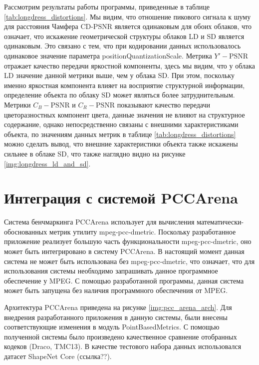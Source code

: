 Рассмотрим результаты работы программы, приведенные в таблице
\ref{tab:longdress_distortions}. Мы видим, что отношение пикового сигнала к шуму
для расстояния Чамфера $\text{CD-PSNR}$ является одинаковым для обоих облаков,
что означает, что искажение геометрической структуры облаков LD и SD является
одинаковым. Это связано с тем, что при кодировании данных использовалось
одинаковое значение параметра positionQuantizationScale. Метрика
$Y'-\text{PSNR}$ отражает качество передачи яркостной компоненты, здесь мы
видим, что у облака LD значение данной метрики выше, чем у облака SD. При этом,
поскольку именно яркостная компонента влияет на восприятие структурной
информации, определение объекта по облаку SD может являться более
затруднительным. Метрики $C_{B}-\text{PSNR}$ и $C_{R}-\text{PSNR}$ показывают
качество передачи цветоразностных компонент цвета, данные значения не влияют на
структурное содержание, однако непосредственно связаны с внешними
характеристиками объекта, по значениям данных метрик в таблице
\ref{tab:longdress_distortions} можно сделать вывод, что внешние характеристики
объекта также искажены сильнее в облаке SD, что также наглядно видно на рисунке
\ref{img:longdress_ld_and_sd}.



\section{Интеграция с системой PCCArena}

Система бенчмаркинга PCCArena использует для вычисления
математически-обоснованных метрик утилиту mpeg-pcc-dmetric. Поскольку
разработанное приложение реализует большую часть функциональности
mpeg-pcc-dmetric, оно может быть интегрировано в систему PCCArena. В настоящий
момент данная система не может быть использована без mpeg-pcc-dmetric, что
означает, что для использования системы необходимо запрашивать данное
программное обеспечение у MPEG. С помощью разработанной программы, данная
система может быть запущена без наличия программного обеспечения от MPEG.


Архитектура PCCArena приведена на рисунке \ref{img:pcc_arena_arch}. Для
внедрения разработанного приложения в данную системы, были внесены
соответствующие изменения в модуль PointBasedMetrics. С помощью полученной
системы было произведено качественное сравнение отобранных кодеков (Draco,
TMC13). В качестве тестового набора данных использовался датасет ShapeNet Core
(ссылка??).

